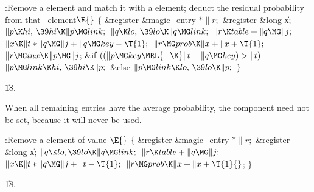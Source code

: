 \Y\B\4:Remove a  element and match it with a 
element; deduct the residual probability from that ~element\X${}%
\E{}$\6
${}\{{}$\5
\1\&{register} \&{magic\_entry} ${}{*}\|r;{}$\6
\&{register} \&{long} \|x;\7
${}\|p\K\\{hi},\,\39\\{hi}\K\|p\MG\\{link};{}$\6
${}\|q\K\\{lo},\,\39\\{lo}\K\|q\MG\\{link};{}$\6
${}\|r\K\\{table}+\|q\MG\|j;{}$\6
${}\|x\K\|t*\|q\MG\|j+\|q\MG\\{key}-\T{1};{}$\6
${}\|r\MG\\{prob}\K\|x+\|x+\T{1};{}$\6
${}\|r\MG\\{inx}\K\|p\MG\|j{}$;\6
\&{if} ${}((\|p\MG\\{key}\MRL{-{\K}}\|t-\|q\MG\\{key})>\|t){}$\1\5
${}\|p\MG\\{link}\K\\{hi},\,\39\\{hi}\K\|p;{}$\2\6
\&{else}\1\5
${}\|p\MG\\{link}\K\\{lo},\,\39\\{lo}\K\|p;{}$\2\6
\4${}\}{}$\2\par
\U18.\fi

When all remaining entries have the average probability, the
 component need not be set, because it will never be used.

\Y\B\4:Remove a  element of  value \X${}%
\E{}$\6
${}\{{}$\5
\1\&{register} \&{magic\_entry} ${}{*}\|r;{}$\6
\&{register} \&{long} \|x;\7
${}\|q\K\\{lo},\39\\{lo}\K\|q\MG\\{link};{}$\6
${}\|r\K\\{table}+\|q\MG\|j;{}$\6
${}\|x\K\|t*\|q\MG\|j+\|t-\T{1};{}$\6
${}\|r\MG\\{prob}\K\|x+\|x+\T{1}{}$;\6
\4${}\}{}$\2\par
\U18.\fi

